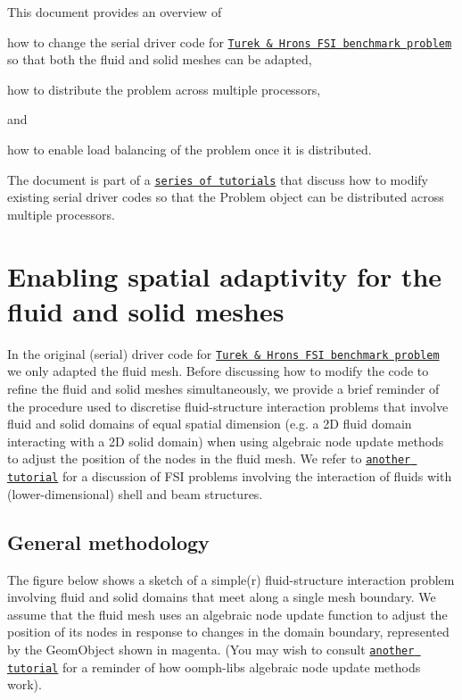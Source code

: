 This document provides an overview of
\begin{DoxyItemize}
\item how to change the serial driver code for \href{../../../interaction/turek_flag/html/index.html}{\tt Turek \& Hron\textquotesingle{}s F\+SI benchmark problem} so that both the fluid and solid meshes can be adapted,
\end{DoxyItemize}
\begin{DoxyItemize}
\item how to distribute the problem across multiple processors,
\end{DoxyItemize}and
\begin{DoxyItemize}
\item how to enable load balancing of the problem once it is distributed.
\end{DoxyItemize}The document is part of a \href{../../../example_code_list/html/index.html#distributed}{\tt series of tutorials} that discuss how to modify existing serial driver codes so that the {\ttfamily Problem} object can be distributed across multiple processors.



 

\hypertarget{index_double_adapt}{}\section{Enabling spatial adaptivity for the fluid and solid meshes}\label{index_double_adapt}
In the original (serial) driver code for \href{../../../interaction/turek_flag/html/index.html}{\tt Turek \& Hron\textquotesingle{}s F\+SI benchmark problem} we only adapted the fluid mesh. Before discussing how to modify the code to refine the fluid and solid meshes simultaneously, we provide a brief reminder of the procedure used to discretise fluid-\/structure interaction problems that involve fluid and solid domains of equal spatial dimension (e.\+g. a 2D fluid domain interacting with a 2D solid domain) when using algebraic node update methods to adjust the position of the nodes in the fluid mesh. We refer to \href{../../fsi_channel_with_leaflet/html/index.html}{\tt another tutorial} for a discussion of F\+SI problems involving the interaction of fluids with (lower-\/dimensional) shell and beam structures.\hypertarget{index_orig}{}\subsection{General methodology}\label{index_orig}
The figure below shows a sketch of a simple(r) fluid-\/structure interaction problem involving fluid and solid domains that meet along a single mesh boundary. We assume that the fluid mesh uses an algebraic node update function to adjust the position of its nodes in response to changes in the domain boundary, represented by the {\ttfamily Geom\+Object} shown in magenta. (You may wish to consult \href{../../../interaction/fsi_collapsible_channel_algebraic/html/index.html}{\tt another tutorial} for a reminder of how {\ttfamily oomph-\/lib\textquotesingle{}s} algebraic node update methods work).

